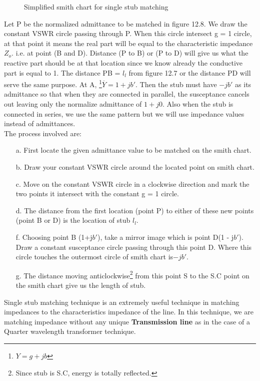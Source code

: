\begin{enumerate}[(i)]
\begin{figure}[h]
\caption{Simplified smith chart for single stub matching}
\end{figure}
Let P be the normalized admittance to be matched in figure 12.8. We draw the constant VSWR circle passing through P. When this circle intersect g = 1 circle, at that point it means the real part will be equal to the characteristic impedance $Z_o$. i.e. at point (B and D). Distance (P to B) or (P to D) will give us what the reactive
part should be at that location since we know already the conductive part is equal to 1. The distance PB = $l_l$ from figure 12.7 or the distance PD will serve the same purpose. At A, \footnote{$Y = g + jb$}$\overline{Y} = 1 + jb' $. Then the stub must have $-jb'$ as its admittance so that when they are connected in parallel, the susceptance cancels out leaving only the normalize admittance of $1 + j0$.
Also when the stub is connected in series, we use the same pattern but we will use impedance values instead of admittances.\\
The process involved are:\\
\begin{itemize}
\item[a.]First locate the given admittance value to be matched on the smith chart.
\item[b.]Draw your constant VSWR circle  around the located point on smith chart.
\item[c.] Move on the constant VSWR circle in a clockwise direction and mark the two points it intersect with the constant g = 1 circle.
\item[d.]The distance from the first location (point P) to either of these new points (point B or D) is the location of stub $l_l$.
\item[f.] Choosing point B (1+j$b'$), take a mirror image which is point D(1 - j$b'$). Draw a constant susceptance circle passing through this point D. Where this circle touches the outermost circle of smith chart is$ -jb'$.
\item[g.] The distance moving anticlockwise\footnote{Since stub is S.C, energy is totally reflected.} from this point S to the S.C point on the smith chart give us the length of stub.
\end{itemize}

Single stub matching technique is an extremely useful technique in matching impedances to the characteristics impedance of the line. In this technique, we are matching impedance without any unique \textbf{Transmission line} as in the case of a Quarter wavelength transformer technique.\\


\end{enumerate}
